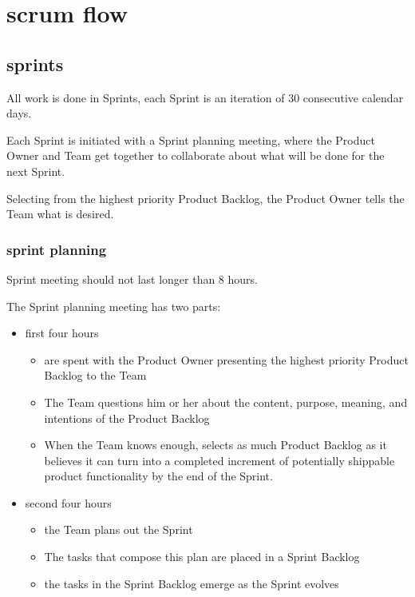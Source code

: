 \section{scrum flow}

\subsection{sprints}

All work is done in Sprints, each Sprint is an iteration of 30 consecutive calendar days.

Each Sprint is initiated with a Sprint planning meeting, where the Product Owner and Team get together to collaborate about what will be done for the next Sprint.

Selecting from the highest priority Product Backlog, the Product Owner tells the Team what is desired.




\subsubsection{sprint planning}

Sprint meeting should not last longer than 8 hours.

The Sprint planning meeting has two parts: 

\begin{itemize}
  \item first four hours
  \begin{itemize}
    \item are spent with the Product Owner presenting the highest priority Product Backlog to the Team
    \item The Team questions him or her about the content, purpose, meaning, and intentions of the Product Backlog
    \item When the Team knows enough, selects as much Product Backlog as it believes it can turn into a completed increment of potentially shippable product functionality by the end of the Sprint.
  \end{itemize}
  \item second four hours
  \begin{itemize}
    \item the Team plans out the Sprint
    \item The tasks that compose this plan are placed in a Sprint Backlog
    \item the tasks in the Sprint Backlog emerge as the Sprint evolves
  \end{itemize}
\end{itemize}

